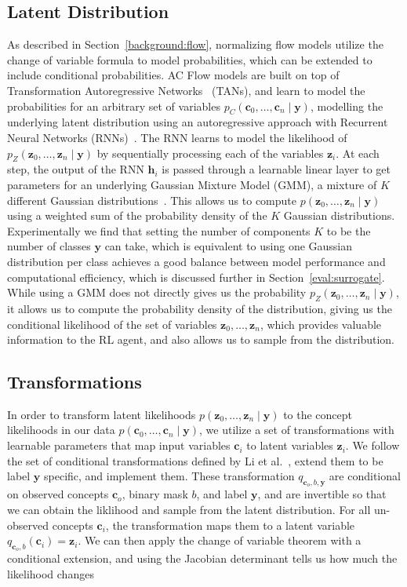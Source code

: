 \subsection{Latent Distribution}

As described in Section~\ref{background:flow}, 
normalizing flow models utilize the change of variable formula to model probabilities,
which can be extended to include conditional probabilities. AC Flow models are built on top of
Transformation Autoregressive
Networks~\cite{tans} (TANs), and learn to model 
the probabilities for an arbitrary set of variables $p_C(\mathbf{c}_0,\ldots, \mathbf{c}_n \mid \mathbf{y})$,
modelling the underlying latent distribution using an autoregressive approach with Recurrent
Neural Networks (RNNs)~\cite{rnn}. The RNN learns to model the likelihood of 
$p_Z(\mathbf{z}_0, \ldots, \mathbf{z}_n \mid \mathbf{y})$ by sequentially processing each of the variables $\mathbf{z}_i$.
At each step, the output of the RNN $\mathbf{h}_i$ is 
passed through a learnable linear layer to get parameters for an underlying Gaussian Mixture Model (GMM),
a mixture of $K$ different Gaussian distributions~\cite{gmm}.
This allows us to compute $p(\mathbf{z}_0, \ldots, \mathbf{z}_n \mid \mathbf{y})$ 
using a weighted
sum of the probability density of the $K$ Gaussian distributions. Experimentally
we find that setting the number of components $K$ to be the number of classes 
$\mathbf{y}$ can take, which is equivalent to using one Gaussian distribution per 
class 
achieves
a good balance between model performance and computational efficiency,
which is discussed further in Section~\ref{eval:surrogate}.
While using a GMM does not directly gives us the probability
$p_Z(\mathbf{z}_0, \ldots, \mathbf{z}_n \mid \mathbf{y})$, it allows us to compute the probability density of the distribution, giving 
us the conditional likelihood of the set of variables $\mathbf{z}_0, \ldots, \mathbf{z}_n$, which provides valuable information
to the RL agent, and also allows us to sample from the distribution.

\subsection{Transformations}
In order to transform latent likelihoods $p(\mathbf{z}_0, \ldots, \mathbf{z}_n \mid \mathbf{y})$ to 
the concept likelihoods in our data
$p(\mathbf{c}_0,\ldots, \mathbf{c}_n \mid \mathbf{y})$, we
utilize a set of transformations with learnable parameters that 
map input variables $\mathbf{c}_i$ to latent variables $\mathbf{z}_i$. We follow the 
set of conditional transformations defined by Li et al.~\cite{acflow}, extend them to
be label $\mathbf{y}$ specific, and implement them.
These transformation $q_{\mathbf{c}_o, b, \mathbf{y}}$ are
conditional on 
observed concepts $\mathbf{c}_o$, binary mask $b$, and label $\mathbf{y}$, 
and are invertible so that we can obtain the liklihood and 
sample from the latent distribution. 
For all un-observed concepts $\mathbf{c}_i$,
the transformation maps them to a latent variable $q_{\mathbf{c}_o, b}(\mathbf{c}_i) = \mathbf{z}_i$. 
We can then apply the change
of variable theorem with a conditional extension, and using
the Jacobian determinant tells us how much the likelihood changes~\cite{normalizing-flows}

